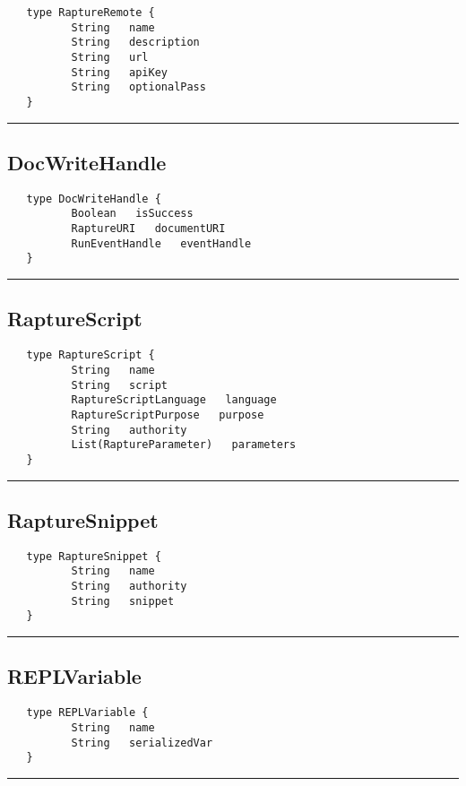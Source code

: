 \begin{verbatim}
   type RaptureRemote {
          String   name
          String   description
          String   url
          String   apiKey
          String   optionalPass
   }
\end{verbatim}

\rule{15cm}{2pt}
\subsection{DocWriteHandle}
\label{type:DocWriteHandle}

\begin{verbatim}
   type DocWriteHandle {
          Boolean   isSuccess
          RaptureURI   documentURI
          RunEventHandle   eventHandle
   }
\end{verbatim}

\rule{15cm}{2pt}
\subsection{RaptureScript}
\label{type:RaptureScript}

\begin{verbatim}
   type RaptureScript {
          String   name
          String   script
          RaptureScriptLanguage   language
          RaptureScriptPurpose   purpose
          String   authority
          List(RaptureParameter)   parameters
   }
\end{verbatim}

\rule{15cm}{2pt}
\subsection{RaptureSnippet}
\label{type:RaptureSnippet}

\begin{verbatim}
   type RaptureSnippet {
          String   name
          String   authority
          String   snippet
   }
\end{verbatim}

\rule{15cm}{2pt}
\subsection{REPLVariable}
\label{type:REPLVariable}

\begin{verbatim}
   type REPLVariable {
          String   name
          String   serializedVar
   }
\end{verbatim}

\rule{15cm}{2pt}

